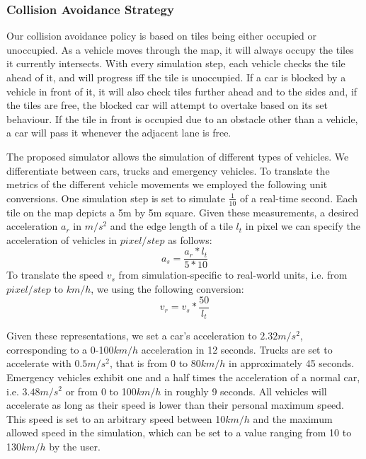 \subsubsection*{Collision Avoidance Strategy}

Our collision avoidance policy is based on tiles being either occupied or unoccupied. As a vehicle moves through the map, it will always occupy the tiles it currently intersects. With every simulation step, each vehicle checks the tile ahead of it, and will progress iff the tile is unoccupied. If a car is blocked by a vehicle in front of it, it will also check tiles further ahead and to the sides and, if the tiles are free, the blocked car will attempt to overtake based on its set behaviour. If the tile in front is occupied due to an obstacle other than a vehicle, a car will pass it whenever the adjacent lane is free.

The proposed simulator allows the simulation of different types of vehicles. We differentiate between cars, trucks and emergency vehicles. To translate the metrics of the different vehicle movements we employed the following unit conversions. One simulation step is set to simulate $\frac{1}{10}$ of a real-time second. Each tile on the map depicts a 5m by 5m square. Given these measurements, a desired acceleration $a_r$ in $m/s^2$ and the edge length of a tile $l_t$ in pixel we can specify the acceleration of vehicles in $pixel/step$ as follows:
	\begin{equation}\label{for:acceleration}	
		a_s = \frac{a_r * l_t}{5 * 10}
	\end{equation}
	To translate the speed $v_s$ from simulation-specific to real-world units, i.e. from $pixel/step$ to $km/h$, we using the following conversion:
	\begin{equation}\label{for:speed}
		v_r = v_s * \frac{50}{l_t} 
	\end{equation}
	
Given these representations, we set a car's acceleration to $2.32m/s^2$, corresponding to a 0-100$km/h$ acceleration in 12 seconds. Trucks are set to accelerate with $0.5m/s^2$, that is from 0 to 80$km/h$ in approximately 45 seconds. Emergency vehicles exhibit 	one and a half times the acceleration of a normal car, i.e. $3.48m/s^2$ or from 0 to 100$km/h$ in roughly 9 seconds. All vehicles will accelerate as long as their speed is lower than their personal maximum speed. This speed is set to an arbitrary speed between 10$km/h$ and the maximum allowed speed in the simulation, which can be set to a value ranging from 10 to 130$km/h$ by the user.

